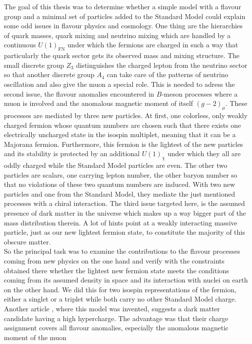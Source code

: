 The goal of this thesis was to determine whether a simple model with a flavour group and a minimal set of particles added to the Standard Model 
could explain some odd issues in flavour physics and cosmology. One thing are the hierarchies of quark masses, quark mixing and neutrino mixing
which are handled by a continuous $U(1)_\text{FN}$ under which the fermions are charged in such a way that particularly the quark sector gets
its observed mass and mixing structure. The small discrete group $Z_3$ distinguishes the charged lepton from the neutrino sector so that another
discrete group $A_4$ can take care of the patterns of neutrino oscillation and also give the muon a special role. This is needed to adress the 
second issue, the 
flavour anomalies encountered in $B$-meson processes where a muon is involved and the anomalous magnetic moment of itself $(g-2)_\mu$. These 
processes are
mediated by three new particles. At first, one colorless, only weakly charged fermion whose quantum numbers are chosen such that there exists one 
electrically uncharged state in the isospin multiplet, meaning that it can be a Majorana fermion. Furthermore, this fermion is the lightest of the
new particles and its stability is protected by an additional $U(1)_\chi$ under which they all are oddly charged while the Standard Model particles 
are even. The other two particles are scalars, one carrying lepton number, the other baryon number so that no violations of these two quantum numbers
are induced. With two new particles and one from the Standard Model, they mediate the just mentioned processes with a chiral interaction. 
The third issue targeted here,
is the assumed presence of dark matter in the universe which makes up a way bigger part of the mass distribution therein. A lot of hints point
at a weakly interacting massive particle, just as our new lightest fermion state, to constitute the majority of this obscure matter. \\
\noindent So the principal task was to examine the contributions to the flavour processes coming from new physics on the one hand and verify
with the constraints obtained there whether the lightest new fermion state meets the conditions coming from its assumed density in space and
its interaction with nuclei on earth on the other hand. We did this for two isospin representations of the fermion, either a singlet or a
triplet while both carry no other Standard Model charge. Another article \cite{Grip}, where this model was invented, suggests a dark matter candidate having
a high hypercharge. The advantage was that their charge assignment covers all flavour anomalies, especially the anomalous magnetic moment of the muon 

